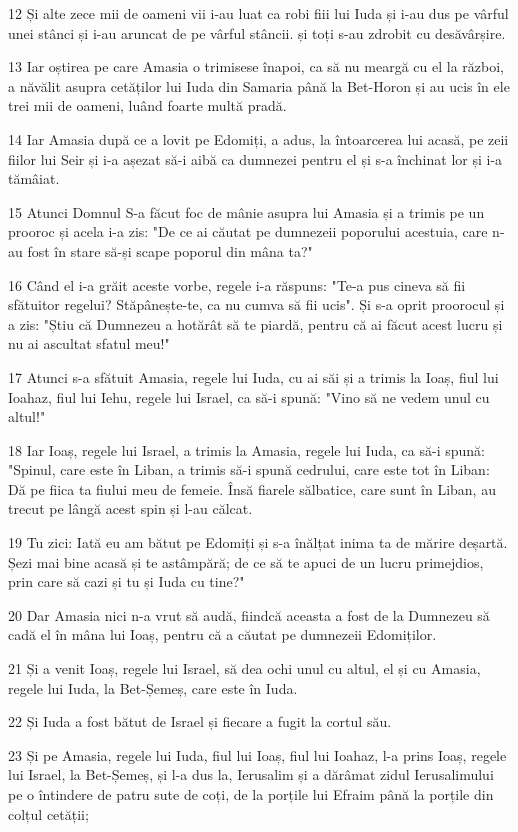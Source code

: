 \par 12 Și alte zece mii de oameni vii i-au luat ca robi fiii lui Iuda și i-au dus pe vârful unei stânci și i-au aruncat de pe vârful stâncii. și toți s-au zdrobit cu desăvârșire.
\par 13 Iar oștirea pe care Amasia o trimisese înapoi, ca să nu meargă cu el la război, a năvălit asupra cetăților lui Iuda din Samaria până la Bet-Horon și au ucis în ele trei mii de oameni, luând foarte multă pradă.
\par 14 Iar Amasia după ce a lovit pe Edomiți, a adus, la întoarcerea lui acasă, pe zeii fiilor lui Seir și i-a așezat să-i aibă ca dumnezei pentru el și s-a închinat lor și i-a tămâiat.
\par 15 Atunci Domnul S-a făcut foc de mânie asupra lui Amasia și a trimis pe un prooroc și acela i-a zis: "De ce ai căutat pe dumnezeii poporului acestuia, care n-au fost în stare să-și scape poporul din mâna ta?"
\par 16 Când el i-a grăit aceste vorbe, regele i-a răspuns: "Te-a pus cineva să fii sfătuitor regelui? Stăpânește-te, ca nu cumva să fii ucis". Și s-a oprit proorocul și a zis: "Știu că Dumnezeu a hotărât să te piardă, pentru că ai făcut acest lucru și nu ai ascultat sfatul meu!"
\par 17 Atunci s-a sfătuit Amasia, regele lui Iuda, cu ai săi și a trimis la Ioaș, fiul lui Ioahaz, fiul lui Iehu, regele lui Israel, ca să-i spună: "Vino să ne vedem unul cu altul!"
\par 18 Iar Ioaș, regele lui Israel, a trimis la Amasia, regele lui Iuda, ca să-i spună: "Spinul, care este în Liban, a trimis să-i spună cedrului, care este tot în Liban: Dă pe fiica ta fiului meu de femeie. Însă fiarele sălbatice, care sunt în Liban, au trecut pe lângă acest spin și l-au călcat.
\par 19 Tu zici: Iată eu am bătut pe Edomiți și s-a înălțat inima ta de mărire deșartă. Șezi mai bine acasă și te astâmpără; de ce să te apuci de un lucru primejdios, prin care să cazi și tu și Iuda cu tine?"
\par 20 Dar Amasia nici n-a vrut să audă, fiindcă aceasta a fost de la Dumnezeu să cadă el în mâna lui Ioaș, pentru că a căutat pe dumnezeii Edomiților.
\par 21 Și a venit Ioaș, regele lui Israel, să dea ochi unul cu altul, el și cu Amasia, regele lui Iuda, la Bet-Șemeș, care este în Iuda.
\par 22 Și Iuda a fost bătut de Israel și fiecare a fugit la cortul său.
\par 23 Și pe Amasia, regele lui Iuda, fiul lui Ioaș, fiul lui Ioahaz, l-a prins Ioaș, regele lui Israel, la Bet-Șemeș, și l-a dus la, Ierusalim și a dărâmat zidul Ierusalimului pe o întindere de patru sute de coți, de la porțile lui Efraim până la porțile din colțul cetății;
